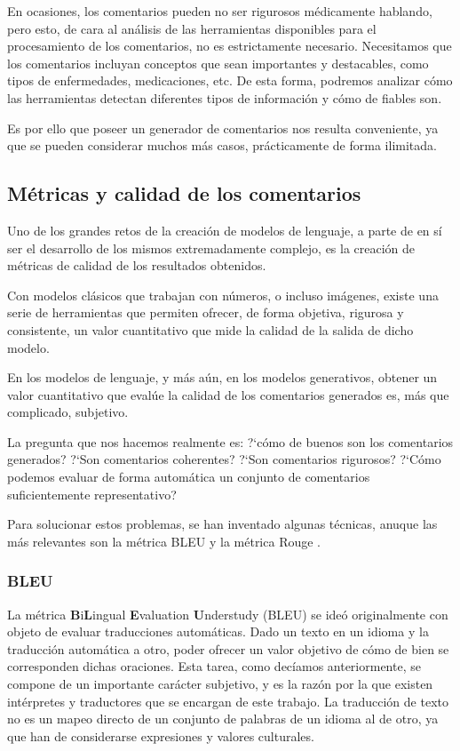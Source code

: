 En ocasiones, los comentarios pueden no ser rigurosos médicamente hablando, pero esto, de cara al análisis de las herramientas disponibles para el procesamiento de los comentarios, no es estrictamente necesario. Necesitamos que los comentarios incluyan conceptos que sean importantes y destacables, como tipos de enfermedades, medicaciones, etc. De esta forma, podremos analizar cómo las herramientas detectan diferentes tipos de información y cómo de fiables son. 

Es por ello que poseer un generador de comentarios nos resulta conveniente, ya que se pueden considerar muchos más casos, prácticamente de forma ilimitada.

\subsection{Métricas y calidad de los comentarios}

Uno de los grandes retos de la creación de modelos de lenguaje, a parte de en sí ser el desarrollo de los mismos extremadamente complejo, es la creación de métricas de calidad de los resultados obtenidos.

Con modelos clásicos que trabajan con números, o incluso imágenes, existe una serie de herramientas que permiten ofrecer, de forma objetiva, rigurosa y consistente, un valor cuantitativo que mide la calidad de la salida de dicho modelo.

En los modelos de lenguaje, y más aún, en los modelos generativos, obtener un valor cuantitativo que evalúe la calidad de los comentarios generados es, más que complicado, subjetivo.

La pregunta que nos hacemos realmente es: ?`cómo de buenos son los comentarios generados? ?`Son comentarios coherentes? ?`Son comentarios rigurosos? ?`Cómo podemos evaluar de forma automática un conjunto de comentarios suficientemente representativo?

Para solucionar estos problemas, se han inventado algunas técnicas, anuque las más relevantes son la métrica BLEU \cite{BLEU} y la métrica Rouge \cite{lin2004rouge}.

\subsubsection{BLEU}
La métrica \textbf{B}i\textbf{L}ingual \textbf{E}valuation \textbf{U}nderstudy (BLEU) se ideó originalmente con objeto de evaluar traducciones automáticas. Dado un texto en un idioma y la traducción automática a otro, poder ofrecer un valor objetivo de cómo de bien se corresponden dichas oraciones. Esta tarea, como decíamos anteriormente, se compone de un importante carácter subjetivo, y es la razón por la que existen intérpretes y traductores que se encargan de este trabajo. La traducción de texto no es un mapeo directo de un conjunto de palabras de un idioma al de otro, ya que han de considerarse expresiones y valores culturales.

